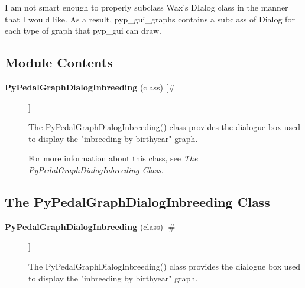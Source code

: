 \par I am not smart enough to properly subclass Wax's DIalog class in the manner that
I would like.  As a result, pyp\_gui\_graphs contains a subclass of Dialog for each
type of graph that pyp\_gui can draw.
\subsection*{Module Contents}
\begin{description}
\item[\textbf{PyPedalGraphDialogInbreeding} (class)  [\#]
]
\par The PyPedalGraphDialogInbreeding() class provides the dialogue box used
to display the "inbreeding by birthyear" graph.
\par For more information about this class, see \textit{The PyPedalGraphDialogInbreeding Class}.

\end{description}
\subsection*{The PyPedalGraphDialogInbreeding Class}
\begin{description}
\item[\textbf{PyPedalGraphDialogInbreeding} (class)  [\#]
]
\par The PyPedalGraphDialogInbreeding() class provides the dialogue box used
to display the "inbreeding by birthyear" graph.

\end{description}
